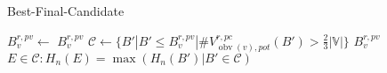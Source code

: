\begin{algorithm}
\caption{Best-Final-Candidate}
\begin{algorithmic}
    
    \state $B_v^{r, pv} \leftarrow$ 
        \return $B_v^{r, pv}$
    \else
        \state $\mathcal{C} \leftarrow \{ B' | B' \leqslant B_v^{r,pv} | \#V^{r, pc}_{\operatorname{obv}(v), pot}(B') > \frac{2}{3} |\mathbb{V}| \}$
            \return $B_v^{r, pv}$
        \else
            \return $E \in \mathcal{C} : H_n (E) = \operatorname{max}\left(H_n (B') | B' \in \mathcal{C}\right)$
        \endif
    \endif
\end{algorithmic}
\end{algorithm}